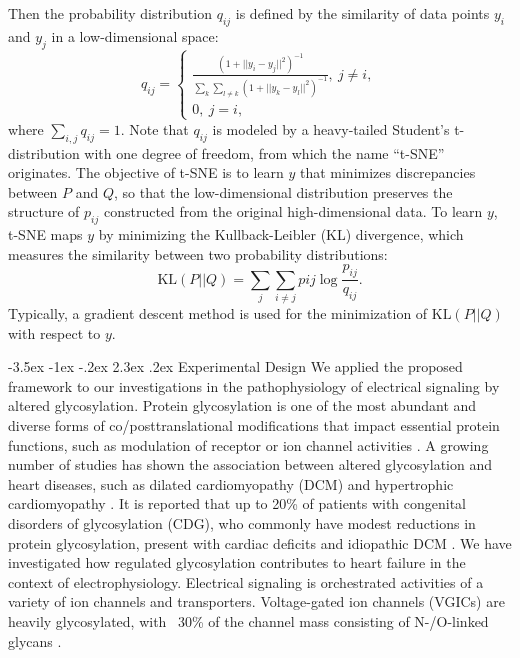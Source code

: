 \documentclass[11pt]{article}
\makeatletter
\renewcommand\section{\@startsection {section}{1}{\z@}%
                                   {-3.5ex \@plus -1ex \@minus -.2ex}%
                                   {2.3ex \@plus.2ex}%
                                   {\normalfont\fontfamily{phv}\fontsize{16}{19}\bfseries}}
\makeatother
\begin{document}
Then the probability distribution $q_{ij}$ is defined by the similarity of data points $y_i$ and $y_j$ in a low-dimensional space:
\begin{equation}
    q_{ij} = 
    \begin{cases}\frac{(1+||y_{i}-y_{j}||^{2})^{-1}}{\sum\limits_{k}\sum\limits_{l \neq k}(1+||y_{k}-y_{l}||^{2})^{-1}}, \ j \neq i, \\
    0, \ j=i,
    \end{cases}
\end{equation}
where $\sum\limits_{i,j}q_{ij}=1$. Note that $q_{ij}$ is modeled by a heavy-tailed Student's t-distribution with one degree of freedom, from which the name ``t-SNE'' originates. The objective of t-SNE is to learn $y$ that minimizes discrepancies between $P$ and $Q$, so that the low-dimensional distribution preserves the structure of $p_{ij}$ constructed from the original high-dimensional data. To learn $y$, t-SNE maps $y$ by minimizing the Kullback-Leibler (KL) divergence, which measures the similarity between two probability distributions:
\begin{equation}
    \mathrm{KL}(P||Q) = \sum\limits_{j}\sum\limits_{i \neq j}p{ij}\log \frac{p_{ij}}{q_{ij}}.
\end{equation}
Typically, a gradient descent method is used for the minimization of $\mathrm{KL}(P||Q)$ with respect to $y$.

\section{Experimental Design}
We applied the proposed framework to our investigations in the pathophysiology of electrical signaling by altered glycosylation. Protein glycosylation is one of the most abundant and diverse forms of co/posttranslational modifications that impact essential protein functions, such as modulation of receptor or ion channel activities \citep{ohtsubo2006glycosylation,ednie2012modulation}. A growing number of studies has shown the association between altered glycosylation and heart diseases, such as dilated cardiomyopathy (DCM) and hypertrophic cardiomyopathy \citep{ohtsubo2006glycosylation,ednie2019reduced2}. It is reported that up to 20\% of patients with congenital disorders of glycosylation (CDG), who commonly have modest reductions in protein glycosylation, present with cardiac deficits and idiopathic DCM \citep{marques2017cardiac}. We have investigated how regulated glycosylation contributes to heart failure in the context of electrophysiology. Electrical signaling is orchestrated activities of a variety of ion channels and transporters. Voltage-gated ion channels (VGICs) are heavily glycosylated, with ~30\% of the channel mass consisting of N-/O-linked glycans \citep{ednie2012modulation}.
\end{document}
